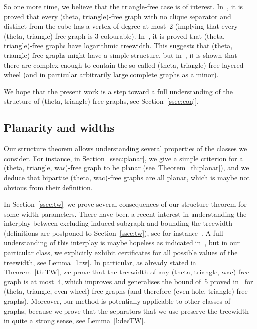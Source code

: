 \documentclass[11pt]{article}
\begin{document}
So one more time, we believe that the triangle-free case is of interest.  
In~\cite{radovanovicV:theta}, it is proved that every (theta, triangle)-free graph with no clique separator and distinct from the cube has a vertex of degree at most~2 (implying that every (theta, triangle)-free graph is 3-colourable). In~\cite{abrishamiEtAl:twIII}, it is proved that (theta, triangle)-free graphs have logarithmic treewidth.  
This suggests that (theta, triangle)-free graphs might have a simple structure, but in~\cite{DBLP:journals/jgt/SintiariT21}, it is shown that there are complex enough to  contain the so-called (theta, triangle)-free layered wheel (and in particular arbitrarily large complete graphs as a minor). 

We hope that the present work is a step toward a full understanding of the structure of (theta, triangle)-free graphs, see Section~\ref{ssec:conj}. 



\subsection*{Planarity and widths}

Our structure theorem allows understanding several properties of the classes we consider. For instance, in Section~\ref{ssec:planar}, we give a simple criterion for a (theta, triangle, wac)-free graph to be planar (see~Theorem~\ref{th:planar}), and we deduce that bipartite (theta, wac)-free graphs are all planar, which is maybe not obvious from their definition.  

In Section~\ref{ssec:tw}, we prove several consequences of our structure theorem for some width parameters.  
There have been a recent interest in understanding the interplay between excluding induced subgraph and bounding the treewidth (definitions are postponed to Section~\ref{ssec:tw}), see for instance~\cite{abrishamiEtAl:twIII}. 
A full understanding of this interplay is maybe hopeless as indicated in~\cite{alecuEtAl:largeTW}, but in our particular class, we explicitly exhibit certificates for all possible values of the treewidth, see Lemma~\ref{l:tw}.  
In particular, as already stated in Theorem~\ref{th:TW}, we prove that the treewidth of any (theta, triangle, wac)-free graph is at most~4, which improves and generalises the bound of~5 proved in~\cite{DBLP:journals/dm/CameronSHV18} for (theta, triangle, even wheel)-free graphs (and therefore (even hole, triangle)-free graphs).  
Moreover, our method is potentially applicable to other classes of graphs, because we prove that the separators that we use preserve the treewidth in quite a strong sense, see Lemma~\ref{l:decTW}. 
\end{document}
